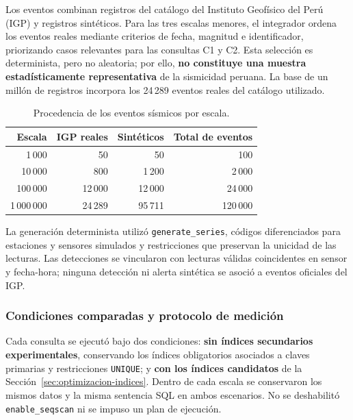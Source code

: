 \documentclass[12pt,a4paper]{article}
\begin{document}
Los eventos combinan registros del catálogo del Instituto
Geofísico del Perú (IGP) y registros sintéticos. Para las tres
escalas menores, el integrador ordena los eventos reales mediante
criterios de fecha, magnitud e identificador, priorizando casos
relevantes para las consultas C1 y C2. Esta selección es
determinista, pero no aleatoria; por ello, \textbf{no constituye una
muestra estadísticamente representativa} de la sismicidad peruana.
La base de un millón de registros incorpora los 24\,289 eventos
reales del catálogo utilizado.

\begin{table}[H]
\centering\small
\begin{tabular}{rrrr}
\toprule
\textbf{Escala} & \textbf{IGP reales} &
\textbf{Sintéticos} & \textbf{Total de eventos} \\
\midrule
1\,000 & 50 & 50 & 100 \\
10\,000 & 800 & 1\,200 & 2\,000 \\
100\,000 & 12\,000 & 12\,000 & 24\,000 \\
1\,000\,000 & 24\,289 & 95\,711 & 120\,000 \\
\bottomrule
\end{tabular}

\caption{Procedencia de los eventos sísmicos por escala.}
\label{tab:igp-sinteticos-escalas-52}
\end{table}

La generación determinista utilizó \texttt{generate\_series},
códigos diferenciados para estaciones y sensores simulados y
restricciones que preservan la unicidad de las lecturas. Las
detecciones se vincularon con lecturas válidas coincidentes en
sensor y fecha-hora; ninguna detección ni alerta sintética se
asoció a eventos oficiales del IGP.

\subsubsection{Condiciones comparadas y protocolo de medición}

Cada consulta se ejecutó bajo dos condiciones: \textbf{sin índices
secundarios experimentales}, conservando los índices obligatorios
asociados a claves primarias y restricciones \texttt{UNIQUE}; y
\textbf{con los índices candidatos} de la
Sección~\ref{sec:optimizacion-indices}. Dentro de cada escala se
conservaron los mismos datos y la misma sentencia SQL en ambos
escenarios. No se deshabilitó \texttt{enable\_seqscan} ni se impuso
un plan de ejecución.
\end{document}
